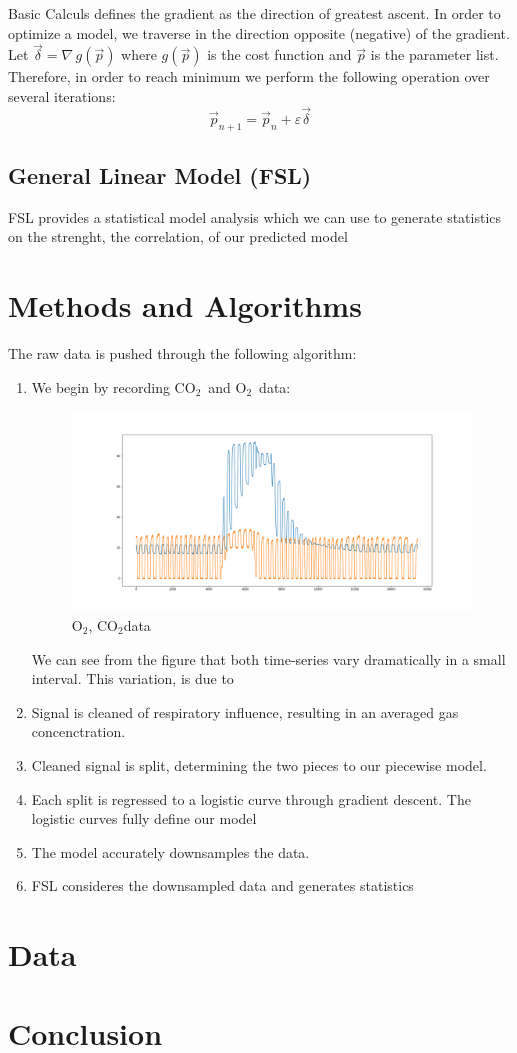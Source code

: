 \documentclass{article}
\newcommand{\subtwo}{$_2$}
\begin{document}
Basic Calculs defines the gradient as the direction of greatest ascent. In order to optimize a model, we traverse in the direction opposite (negative) of the gradient. \\

Let $\vec{\delta} = \nabla \,g(\vec{p})$ where $g(\vec{p})$ is the cost function and $\vec{p}$ is the parameter list. Therefore,  in order to reach minimum we perform the following operation over several iterations:
$$\vec{p}_{n+1} = \vec{p}_n + \varepsilon\vec{\delta} $$ %
\subsection*{General Linear Model (FSL)}
FSL provides a statistical model analysis which we can use to generate statistics on the strenght, the correlation, of our predicted model

\section*{Methods and Algorithms}
The raw data is pushed through the following algorithm:
\begin{enumerate}
  \item We begin by recording CO\subtwo\,  and O\subtwo\,  data:
    \begin{figure}[h!]
      \includegraphics[width=\linewidth]{raw_data.png}
      \caption{O\subtwo, CO\subtwo data}
      \label{fig:rawData}
    \end{figure}
    We can see from the figure that both time-series vary dramatically in a small interval. This variation, is due to 
  \item Signal is cleaned of respiratory influence, resulting in an averaged gas concenctration.
  \item Cleaned signal is split, determining the two pieces to our piecewise model.
  \item Each split is regressed to a logistic curve through gradient descent. The logistic curves fully define our model
  \item The model accurately downsamples the data.
  \item FSL consideres the downsampled data and generates statistics
\end{enumerate}

\section*{Data}


\section*{Conclusion}
\end{document}
